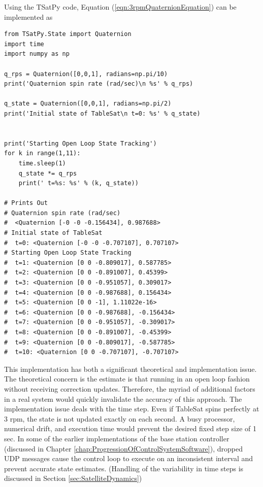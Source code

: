 Using the TSatPy code, Equation (\ref{eqn:3rpmQuaternionEquation}) can be implemented as

\begin{singlespace}
  \begin{verbatim}
from TSatPy.State import Quaternion
import time
import numpy as np

q_rps = Quaternion([0,0,1], radians=np.pi/10)
print('Quaternion spin rate (rad/sec)\n %s' % q_rps)

q_state = Quaternion([0,0,1], radians=np.pi/2)
print('Initial state of TableSat\n t=0: %s' % q_state)


print('Starting Open Loop State Tracking')
for k in range(1,11):
    time.sleep(1)
    q_state *= q_rps
    print(' t=%s: %s' % (k, q_state))

# Prints Out
# Quaternion spin rate (rad/sec)
#  <Quaternion [-0 -0 -0.156434], 0.987688>
# Initial state of TableSat
#  t=0: <Quaternion [-0 -0 -0.707107], 0.707107>
# Starting Open Loop State Tracking
#  t=1: <Quaternion [0 0 -0.809017], 0.587785>
#  t=2: <Quaternion [0 0 -0.891007], 0.45399>
#  t=3: <Quaternion [0 0 -0.951057], 0.309017>
#  t=4: <Quaternion [0 0 -0.987688], 0.156434>
#  t=5: <Quaternion [0 0 -1], 1.11022e-16>
#  t=6: <Quaternion [0 0 -0.987688], -0.156434>
#  t=7: <Quaternion [0 0 -0.951057], -0.309017>
#  t=8: <Quaternion [0 0 -0.891007], -0.45399>
#  t=9: <Quaternion [0 0 -0.809017], -0.587785>
#  t=10: <Quaternion [0 0 -0.707107], -0.707107>
  \end{verbatim}
  \nocite{minted}
\end{singlespace}

This implementation has both a significant theoretical and implementation issue.  The theoretical concern is the estimate is that running in an open loop fashion without receiving correction updates.  Therefore, the myriad of additional factors in a real system would quickly invalidate the accuracy of this approach.  The implementation issue deals with the time step.  Even if TableSat spins perfectly at 3 rpm, the state is not updated exactly on each second.  A busy processor, numerical drift, and execution time would prevent the desired fixed step size of 1 sec.  In some of the earlier implementations of the base station controller (discussed in Chapter \ref{chap:ProgressionOfControlSystemSoftware}), dropped UDP messages cause the control loop to execute on an inconsistent interval and prevent accurate state estimates.  (Handling of the variability in time steps is discussed in Section \ref{sec:SatelliteDynamics})


